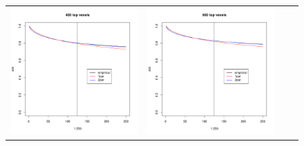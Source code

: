 \documentclass[12pt]{article}
\begin{document}
\begin{figure}
\begin{center}
\begin{tabular}{cccc}
\includegraphics[scale=0.3]{../Yuval/ident_extrap4.pdf} &
\includegraphics[scale=0.3]{../Yuval/ident_extrap5.pdf} &

\end{tabular}
\end{center}
\end{figure}
\end{document}
